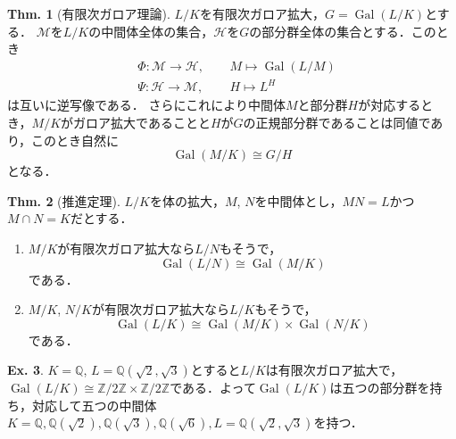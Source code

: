 \documentclass[dvipdfmx,b5paper,papersize]{jsarticle}
\theoremstyle{definition}
\newtheorem{thm}{Thm.}
\newtheorem{ex}[thm]{Ex.}
\DeclareMathOperator{\Gal}{Gal}
\begin{document}
\begin{thm}[有限次ガロア理論]\label{thm:finite_galois_theory}
  $L/K$を有限次ガロア拡大，$G=\Gal(L/K)$とする．
  $\mathcal{M}$を$L/K$の中間体全体の集合，$\mathcal{H}$を$G$の部分群全体の集合とする．このとき
  \begin{eqnarray*}
  &\Phi \colon \mathcal{M} \to \mathcal{H},&\hspace{15pt} M \mapsto \Gal(L/M)\\
  &\Psi \colon \mathcal{H}\to \mathcal{M},&\hspace{15pt} H \mapsto L^H
\end{eqnarray*}
  は互いに逆写像である．
  さらにこれにより中間体$M$と部分群$H$が対応するとき，$M/K$がガロア拡大であることと$H$が$G$の正規部分群であることは同値であり，このとき自然に
  \[
  \Gal(M/K) \cong G/H
  \]
  となる．
\end{thm}

\begin{thm}[推進定理]\label{thm:translation}
  $L/K$を体の拡大，$M$, $N$を中間体とし，$MN=L$かつ$M \cap N=K$だとする．
  \begin{enumerate}
    \item $M/K$が有限次ガロア拡大なら$L/N$もそうで，
    \[
    \Gal(L/N) \cong \Gal(M/K)
    \]
    である．
    \item $M/K$, $N/K$が有限次ガロア拡大なら$L/K$もそうで，
    \[
    \Gal(L/K) \cong \Gal(M/K) \times \Gal(N/K)
    \]
    である．
  \end{enumerate}
\end{thm}

\begin{ex}
  $K=\mathbb{Q}$, $L=\mathbb{Q}(\sqrt{2},\sqrt{3})$とすると$L/K$は有限次ガロア拡大で，$\Gal(L/K) \cong \mathbb{Z}/2\mathbb{Z} \times \mathbb{Z}/2\mathbb{Z}$である．よって$\Gal(L/K)$は五つの部分群を持ち，対応して五つの中間体$K=\mathbb{Q}, \mathbb{Q}(\sqrt{2}), \mathbb{Q}(\sqrt{3}), \mathbb{Q}(\sqrt{6}), L=\mathbb{Q}(\sqrt{2},\sqrt{3})$を持つ．
\end{ex}
\end{document}
